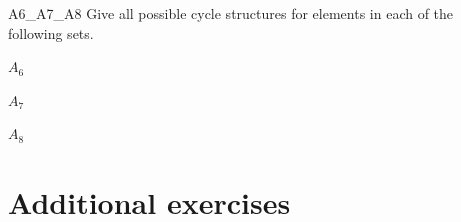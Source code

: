 \begin{exercise}{A6_A7_A8}
Give all possible cycle structures for elements in each of the following sets.
\begin{enumerate}[(a)]
\begin{multicols}{3}
\item
$A_6$
\item
$A_7$
\item
$A_8$
\end{multicols}
\end{enumerate}
\end{exercise}


\section{Additional exercises}
 
